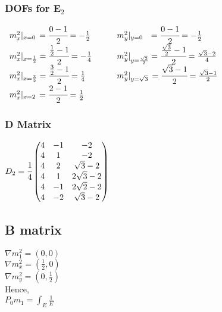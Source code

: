 \documentclass{article}
\begin{document}
{\subsubsection{DOFs for E$_2$}
$\begin{array}{ll}
m_x^2|_{x=0}\hspace{1.5pt} = \cfrac{0-1}{2} = -\frac{1}{2} &\qquad m_y^2|_{y=0} \hspace{7pt}= \cfrac{0-1}{2} = -\frac{1}{2} \\
m_x^2|_{x=\frac{1}{2}} = \cfrac{\frac{1}{2}-1}{2} = -\frac{1}{4} &\qquad m_y^2|_{y=\frac{\sqrt{3}}{2}} = \cfrac{\frac{\sqrt{3}}{2}-1}{2} = \frac{\sqrt{3}-2}{4} \\
m_x^2|_{x=\frac{3}{2}} = \cfrac{\frac{3}{2}-1}{2} = \frac{1}{4} &\qquad m_y^2|_{y=\sqrt{3}}\, = \cfrac{\sqrt{3}-1}{2} = \frac{\sqrt{3}-1}{2} \\
m_x^2|_{x=2}\hspace{1.5pt} = \cfrac{2-1}{2} = \frac{1}{2} &
\end{array}$

\subsubsection{D Matrix}

$D_2 = \cfrac{1}{4}\begin{pmatrix}
    4 & -1 & - 2\\
    4 & 1 & - 2\\
    4 & 2 & \sqrt{3} - 2\\
    4 & 1 & 2\sqrt{3} - 2\\
    4 & -1 & 2\sqrt{2} - 2\\
    4 & -2 & \sqrt{3} - 2\\
\end{pmatrix}$

\subsection{B matrix}
$\nabla m_1^2 = (0,0)$\\
$\nabla m_x^2 = (\frac{1}{2},0)$ \\
$\nabla m_y^2 = (0,\frac{1}{2})$ \\

Hence, \\
$P_0m_1 = \int_E\frac{1}{E}$




}
\end{document}
